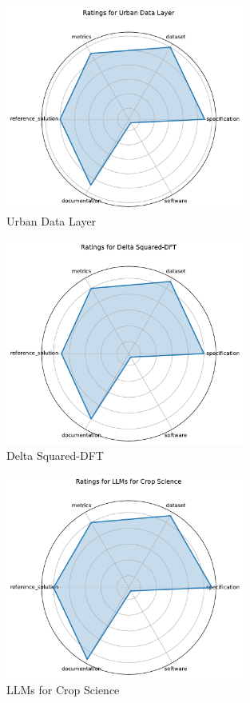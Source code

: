 \documentclass{article}
\begin{document}
\begin{figure}[h!]
  \centering
  \includegraphics[width=0.7\textwidth]{Urban Data Layer_radar.pdf}
  \caption{Urban Data Layer}
\end{figure}

\begin{figure}[h!]
  \centering
  \includegraphics[width=0.7\textwidth]{Delta Squared-DFT_radar.pdf}
  \caption{Delta Squared-DFT}
\end{figure}

\begin{figure}[h!]
  \centering
  \includegraphics[width=0.7\textwidth]{LLMs for Crop Science_radar.pdf}
  \caption{LLMs for Crop Science}
\end{figure}
\end{document}
